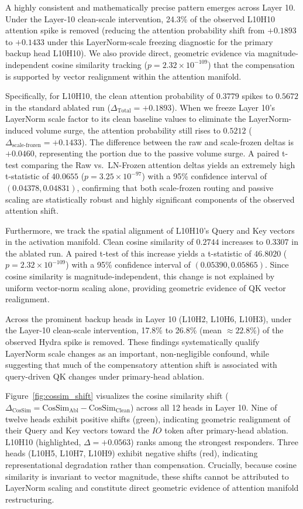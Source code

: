 \documentclass[12pt,a4paper]{article}
\begin{document}
A highly consistent and mathematically precise pattern emerges across Layer 10. Under the Layer-10 clean-scale intervention, 24.3\% of the observed L10H10 attention spike is removed (reducing the attention probability shift from $+0.1893$ to $+0.1433$ under this LayerNorm-scale freezing diagnostic for the primary backup head L10H10). We also provide direct, geometric evidence via magnitude-independent cosine similarity tracking ($p = 2.32 \times 10^{-109}$) that the compensation is supported by vector realignment within the attention manifold.

Specifically, for L10H10, the clean attention probability of $0.3779$ spikes to $0.5672$ in the standard ablated run ($\Delta_\text{Total} = +0.1893$). When we freeze Layer 10's LayerNorm scale factor to its clean baseline values to eliminate the LayerNorm-induced volume surge, the attention probability still rises to $0.5212$ ($\Delta_\text{scale-frozen} = +0.1433$). The difference between the raw and scale-frozen deltas is $+0.0460$, representing the portion due to the passive volume surge. A paired t-test comparing the Raw vs.\ LN-Frozen attention deltas yields an extremely high t-statistic of $40.0655$ ($p = 3.25 \times 10^{-97}$) with a 95\% confidence interval of $(0.04378, 0.04831)$, confirming that both scale-frozen routing and passive scaling are statistically robust and highly significant components of the observed attention shift.

Furthermore, we track the spatial alignment of L10H10's Query and Key vectors in the activation manifold. Clean cosine similarity of $0.2744$ increases to $0.3307$ in the ablated run. A paired t-test of this increase yields a t-statistic of $46.8020$ ($p = 2.32 \times 10^{-109}$) with a 95\% confidence interval of $(0.05390, 0.05865)$. Since cosine similarity is magnitude-independent, this change is not explained by uniform vector-norm scaling alone, providing geometric evidence of QK vector realignment.

Across the prominent backup heads in Layer 10 (L10H2, L10H6, L10H3), under the Layer-10 clean-scale intervention, 17.8\% to 26.8\% (mean $\approx 22.8\%$) of the observed Hydra spike is removed. These findings systematically qualify LayerNorm scale changes as an important, non-negligible confound, while suggesting that much of the compensatory attention shift is associated with query-driven QK changes under primary-head ablation.

Figure~\ref{fig:cossim_shift} visualizes the cosine similarity shift ($\Delta_\text{CosSim} = \text{CosSim}_\text{Abl} - \text{CosSim}_\text{Clean}$) across all 12 heads in Layer 10. Nine of twelve heads exhibit positive shifts (green), indicating geometric realignment of their Query and Key vectors toward the $IO$ token after primary-head ablation. L10H10 (highlighted, $\Delta = +0.0563$) ranks among the strongest responders. Three heads (L10H5, L10H7, L10H9) exhibit negative shifts (red), indicating representational degradation rather than compensation. Crucially, because cosine similarity is invariant to vector magnitude, these shifts cannot be attributed to LayerNorm scaling and constitute direct geometric evidence of attention manifold restructuring.
\end{document}
